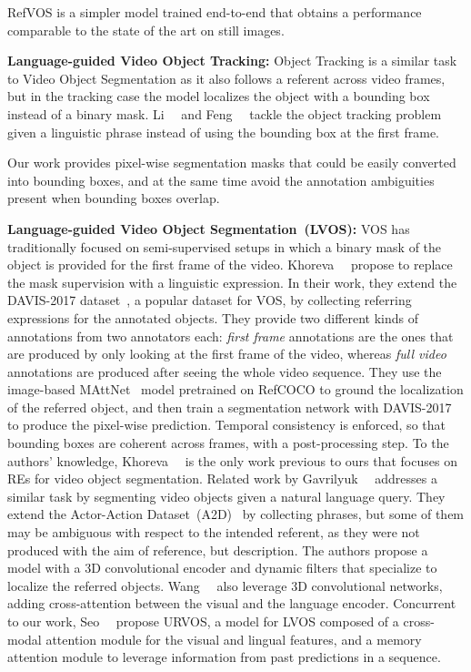 \documentclass[10pt,twocolumn,letterpaper]{article}
\begin{document}
RefVOS is a simpler model trained end-to-end that obtains a performance comparable to the state of the art on still images.



\noindent
\textbf{Language-guided Video Object Tracking:} Object Tracking is a similar task to Video Object Segmentation as it also follows a referent across video frames, but in the tracking case the model localizes the object with a bounding box instead of a binary mask. Li~\etal~\cite{li2017tracking} and Feng~\etal~\cite{feng2020real} tackle the object tracking problem given a linguistic phrase instead of using the bounding box at the first frame.


Our work provides pixel-wise segmentation masks that could be easily converted into bounding boxes, and at the same time avoid the annotation ambiguities present when bounding boxes overlap.

\noindent
\textbf{Language-guided Video Object Segmentation~(LVOS):} VOS \cite{perazzi2016benchmark,xu2018youtube} has traditionally focused on semi-supervised setups in which
a binary mask of the object is provided for the first frame of the video.
Khoreva~\etal~\cite{khoreva2018video} propose to replace the mask supervision with a linguistic expression.
In their work, they extend the  DAVIS-2017 dataset~\cite{pont20172017}, a popular dataset for VOS, by collecting referring expressions for the annotated objects. They provide two different kinds of annotations from two annotators each: \textit{first frame} annotations are the ones that are produced by only looking at the first frame of the video, whereas \textit{full video} annotations are produced after seeing the whole video sequence.
They use the image-based MAttNet~\cite{yu2018mattnet} model pretrained on RefCOCO to ground the localization of the referred object, and then train a segmentation network with DAVIS-2017 to produce the pixel-wise prediction. Temporal consistency is enforced, so that bounding boxes are coherent across frames, with a post-processing step.
To the authors' knowledge, Khoreva~\etal~\cite{khoreva2018video} is the only work previous to ours that focuses on REs for video object segmentation. Related work by Gavrilyuk~\etal~\cite{gavrilyuk2018actor} addresses a similar task by segmenting video objects given a natural language query. They extend the Actor-Action Dataset~(A2D)~\cite{xu2015can} by collecting phrases, but some of them may be ambiguous with respect to the intended referent, as they were not produced with the aim of reference, but description. 
The authors propose a model with a 3D convolutional encoder and dynamic filters that specialize to localize the referred objects. Wang~\etal~\cite{wang2019asymmetric} also leverage 3D convolutional networks, adding cross-attention between the visual and the language encoder. Concurrent to our work, Seo~\etal~\cite{seourvos} propose URVOS, a model for LVOS composed of a cross-modal attention module for the visual and lingual features, and a memory attention module to leverage information from past predictions in a sequence. 
\end{document}

